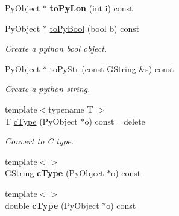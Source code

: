\begin{Indent}
\begin{DoxyCompactItemize}
\mbox{\label{classrev_1_1_python_a_p_i_ad9dbaec04f51f6342ef3172711aac53e}} 
Py\+Object $\ast$ {\bfseries to\+Py\+Lon} (int i) const
\item 
\mbox{\label{classrev_1_1_python_a_p_i_a361e7fe976f9789f4a4772620fb305d8}} 
Py\+Object $\ast$ \mbox{\hyperlink{classrev_1_1_python_a_p_i_a361e7fe976f9789f4a4772620fb305d8}{to\+Py\+Bool}} (bool b) const
\begin{DoxyCompactList}\small\item\em Create a python bool object. \end{DoxyCompactList}\item 
\mbox{\label{classrev_1_1_python_a_p_i_a764e27351af8ba010227f9bf083b912b}} 
Py\+Object $\ast$ \mbox{\hyperlink{classrev_1_1_python_a_p_i_a764e27351af8ba010227f9bf083b912b}{to\+Py\+Str}} (const \mbox{\hyperlink{classrev_1_1_g_string}{G\+String}} \&s) const
\begin{DoxyCompactList}\small\item\em Create a python string. \end{DoxyCompactList}\item 
\mbox{\label{classrev_1_1_python_a_p_i_a58ac67ba8e91e4e05fbb4c6de05e4a37}} 
{\footnotesize template$<$typename T $>$ }\\T \mbox{\hyperlink{classrev_1_1_python_a_p_i_a58ac67ba8e91e4e05fbb4c6de05e4a37}{c\+Type}} (Py\+Object $\ast$o) const =delete
\begin{DoxyCompactList}\small\item\em Convert to C type. \end{DoxyCompactList}\item 
\mbox{\label{classrev_1_1_python_a_p_i_ade4097f34e5c6d757da2f67fe6b2c11f}} 
{\footnotesize template$<$$>$ }\\\mbox{\hyperlink{classrev_1_1_g_string}{G\+String}} {\bfseries c\+Type} (Py\+Object $\ast$o) const
\item 
\mbox{\label{classrev_1_1_python_a_p_i_a5ebebcb83f7d0d3e9032dfbb6134ee17}} 
{\footnotesize template$<$$>$ }\\double {\bfseries c\+Type} (Py\+Object $\ast$o) const

\end{DoxyCompactItemize}
\end{Indent}
